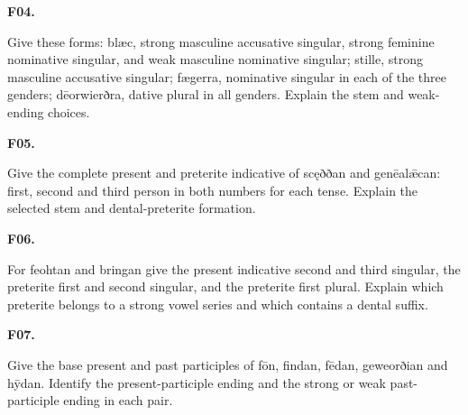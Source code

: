 \par\begin{minipage}{\linewidth}\raggedright
\textbf{F04.}

Give these forms: blæc, strong masculine accusative singular, strong feminine nominative singular, and weak masculine nominative singular; stille, strong masculine accusative singular; fægerra, nominative singular in each of the three genders; dēorwierðra, dative plural in all genders. Explain the stem and weak-ending choices.

\end{minipage}\par\addvspace{4pt}

\par\begin{minipage}{\linewidth}\raggedright
\textbf{F05.}

Give the complete present and preterite indicative of scęððan and genēalǣcan: first, second and third person in both numbers for each tense. Explain the selected stem and dental-preterite formation.

\end{minipage}\par\addvspace{4pt}

\par\begin{minipage}{\linewidth}\raggedright
\textbf{F06.}

For feohtan and bringan give the present indicative second and third singular, the preterite first and second singular, and the preterite first plural. Explain which preterite belongs to a strong vowel series and which contains a dental suffix.

\end{minipage}\par\addvspace{4pt}

\par\begin{minipage}{\linewidth}\raggedright
\textbf{F07.}

Give the base present and past participles of fōn, findan, fēdan, geweorðian and hȳdan. Identify the present-participle ending and the strong or weak past-participle ending in each pair.

\end{minipage}\par\addvspace{4pt}

